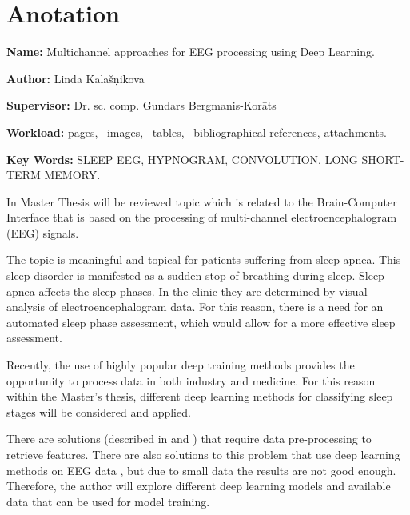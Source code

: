 \documentclass[12pt,paper=A4]{report}
\newcounter{nofappendices}
\begin{document}

\chapter*{Anotation}    

\textbf{Name:}
Multichannel approaches for EEG processing using Deep Learning.

\textbf{Author:} Linda Kalašņikova

\textbf{Supervisor:}
Dr. sc. comp. Gundars Bergmanis-Korāts

\textbf{Workload:} \pageref{LastPage} pages, \totalfigures\ images, \totaltables\ tables, \ bibliographical references,  attachments.

\textbf{Key Words:} SLEEP EEG, HYPNOGRAM, CONVOLUTION, LONG SHORT-TERM MEMORY.
\vspace{5mm}

In Master Thesis will be reviewed topic which is related to the Brain-Computer Interface that is based on the processing of multi-channel electroencephalogram (EEG) signals.

The topic is meaningful and topical for patients suffering from sleep apnea. This sleep disorder is manifested as a sudden stop of breathing during sleep. Sleep apnea affects the sleep phases. In the clinic they are determined by visual analysis of electroencephalogram data. For this reason, there is a need for an automated sleep phase assessment, which would allow for a more effective sleep assessment.

Recently, the use of highly popular deep training methods provides the opportunity to process data in both industry and medicine. For this reason within the Master's thesis, different deep learning methods for classifying sleep stages will be considered and applied.

There are solutions (described in \cite{rahman2018sleep} and \cite{shi2015multi}) that require data pre-processing to retrieve features. There are also solutions to this problem that use deep learning methods on EEG data \cite{git1}, \cite{git2} but due to small data the results are not good enough. Therefore, the author will explore different deep learning models and available data that can be used for model training.
\end{document}
